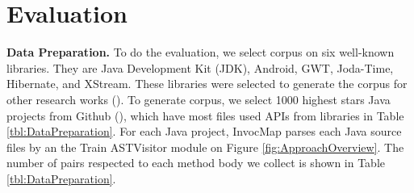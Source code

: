 \section{Evaluation}
\textbf{Data Preparation.} To do the evaluation, we select corpus on six well-known libraries. They are Java Development Kit (JDK), Android, GWT, Joda-Time, Hibernate, and XStream. These libraries were selected to generate the corpus for other research works (\cite{8453132,Subramanian:2014:LAD:2568225.2568313}). To generate corpus, we select 1000 highest stars Java projects from Github (\cite{id:Github}), which have most files used APIs from libraries in Table \ref{tbl:DataPreparation}. For each Java project, InvocMap parses each Java source files by an the Train ASTVisitor module on Figure \ref{fig:ApproachOverview}. The number of pairs respected to each method body we collect is shown in Table \ref{tbl:DataPreparation}. 

